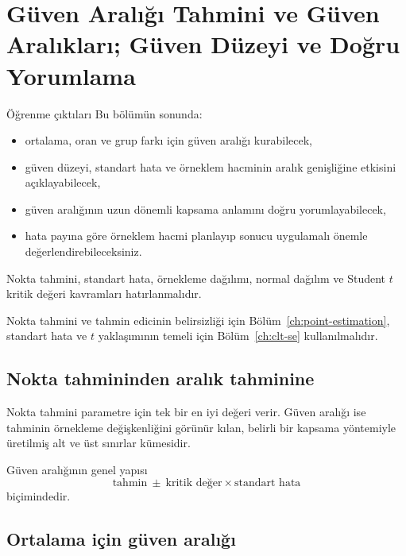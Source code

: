 \chapter{Güven Aralığı Tahmini ve Güven Aralıkları; Güven Düzeyi ve Doğru Yorumlama}
\label{ch:confidence-intervals}

\begin{prismbox}[PrismLight]{Öğrenme çıktıları}
Bu bölümün sonunda:
\begin{itemize}
  \item ortalama, oran ve grup farkı için güven aralığı kurabilecek,
  \item güven düzeyi, standart hata ve örneklem hacminin aralık genişliğine etkisini açıklayabilecek,
  \item güven aralığının uzun dönemli kapsama anlamını doğru yorumlayabilecek,
  \item hata payına göre örneklem hacmi planlayıp sonucu uygulamalı önemle değerlendirebileceksiniz.
\end{itemize}
\end{prismbox}

\begin{prerequisitebox}
Nokta tahmini, standart hata, örnekleme dağılımı, normal dağılım ve Student
$t$ kritik değeri kavramları hatırlanmalıdır.
\end{prerequisitebox}

Nokta tahmini ve tahmin edicinin belirsizliği için Bölüm~\ref{ch:point-estimation},
standart hata ve $t$ yaklaşımının temeli için Bölüm~\ref{ch:clt-se} kullanılmalıdır.

\section{Nokta tahmininden aralık tahminine}

\begin{definitionbox}
Nokta tahmini parametre için tek bir en iyi değeri verir. Güven aralığı ise
tahminin örnekleme değişkenliğini görünür kılan, belirli bir kapsama yöntemiyle
üretilmiş alt ve üst sınırlar kümesidir.
\end{definitionbox}
Güven aralığının genel yapısı
\[
\text{tahmin}\ \pm\ \text{kritik değer}\times\text{standart hata}
\]
biçimindedir.

\section{Ortalama için güven aralığı}
\label{sec:ci-mean}

